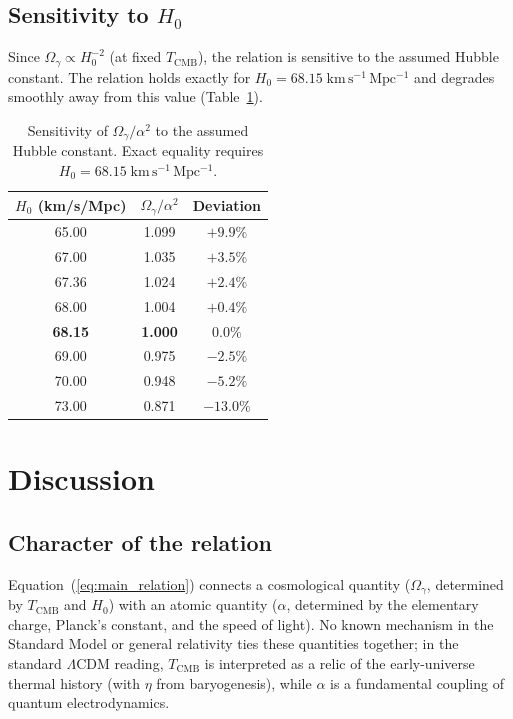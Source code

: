 \documentclass[12pt, a4paper]{article}
\begin{document}
\newpage
\subsection{Sensitivity to \texorpdfstring{$H_0$}{H0}}
\label{sec:sensitivity}

Since $\Omega_\gamma \propto H_0^{-2}$ (at fixed $T_{\mathrm{CMB}}$), the relation is sensitive to the assumed Hubble constant. The relation holds exactly for $H_0 = 68.15\;\mathrm{km\,s^{-1}\,Mpc^{-1}}$ and degrades smoothly away from this value (Table~\ref{tab:sensitivity}).

\begin{table}[H]
\centering
\caption{Sensitivity of $\Omega_\gamma/\alpha^2$ to the assumed Hubble constant. Exact equality requires $H_0 = 68.15\;\mathrm{km\,s^{-1}\,Mpc^{-1}}$.}
\label{tab:sensitivity}
\begin{tabular}{ccc}
\toprule
$H_0$ (km/s/Mpc) & $\Omega_\gamma / \alpha^2$ & Deviation \\
\midrule
65.00 & 1.099 & $+9.9\%$ \\
67.00 & 1.035 & $+3.5\%$ \\
67.36 & 1.024 & $+2.4\%$ \\
68.00 & 1.004 & $+0.4\%$ \\
\textbf{68.15} & \textbf{1.000} & \textbf{$0.0\%$} \\
69.00 & 0.975 & $-2.5\%$ \\
70.00 & 0.948 & $-5.2\%$ \\
73.00 & 0.871 & $-13.0\%$ \\
\bottomrule
\end{tabular}
\end{table}

\section{Discussion}
\label{sec:discussion}

\subsection{Character of the relation}
\label{sec:nature}

Equation~(\ref{eq:main_relation}) connects a cosmological quantity ($\Omega_\gamma$, determined by $T_{\mathrm{CMB}}$ and $H_0$) with an atomic quantity ($\alpha$, determined by the elementary charge, Planck's constant, and the speed of light). No known mechanism in the Standard Model or general relativity ties these quantities together; in the standard $\Lambda$CDM reading, $T_{\mathrm{CMB}}$ is interpreted as a relic of the early-universe thermal history (with $\eta$ from baryogenesis), while $\alpha$ is a fundamental coupling of quantum electrodynamics.
\end{document}
